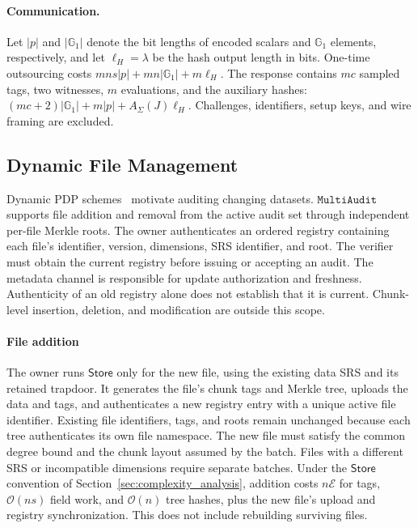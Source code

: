 \documentclass[lettersize,journal]{IEEEtran}
\newcommand{\GG}{\mathbb{G}}
\newcommand{\CompExp}{\mathcal{E}}
\newcommand{\Store}{\ensuremath{\mathsf{Store}}}
\newcommand{\MultiAudit}{\ensuremath{\mathtt{MultiAudit}}}
\begin{document}
\paragraph{Communication.}
Let $|p|$ and $|\GG_1|$ denote the bit lengths of encoded scalars and $\GG_1$ elements, respectively, and let $\ell_H=\lambda$ be the hash output length in bits. One-time outsourcing costs
$
mns|p|+mn|\GG_1|+m\ell_H.
$
The response contains $mc$ sampled tags, two witnesses, $m$ evaluations, and the auxiliary hashes:
$
(mc+2)|\GG_1|+m|p|+A_\Sigma(J)\ell_H.
$
Challenges, identifiers, setup keys, and wire framing are excluded.

\subsection{Dynamic File Management}
Dynamic PDP schemes~\cite{Erway2009DPDP,Wang2011TPDS,Yang2013TPDS,XuTIFS26} motivate auditing changing datasets. \MultiAudit{} supports file addition and removal from the active audit set through independent per-file Merkle roots. The owner authenticates an ordered registry containing each file's identifier, version, dimensions, SRS identifier, and root. The verifier must obtain the current registry before issuing or accepting an audit. The metadata channel is responsible for update authorization and freshness. Authenticity of an old registry alone does not establish that it is current. Chunk-level insertion, deletion, and modification are outside this scope.

\paragraph{File addition}
The owner runs \Store{} only for the new file, using the existing data SRS and its retained trapdoor. It generates the file's chunk tags and Merkle tree, uploads the data and tags, and authenticates a new registry entry with a unique active file identifier. Existing file identifiers, tags, and roots remain unchanged because each tree authenticates its own file namespace. The new file must satisfy the common degree bound and the chunk layout assumed by the batch. Files with a different SRS or incompatible dimensions require separate batches. Under the \Store{} convention of Section~\ref{sec:complexity_analysis}, addition costs $n\CompExp$ for tags, $\mathcal O(ns)$ field work, and $\mathcal O(n)$ tree hashes, plus the new file's upload and registry synchronization. This does not include rebuilding surviving files.
\end{document}
